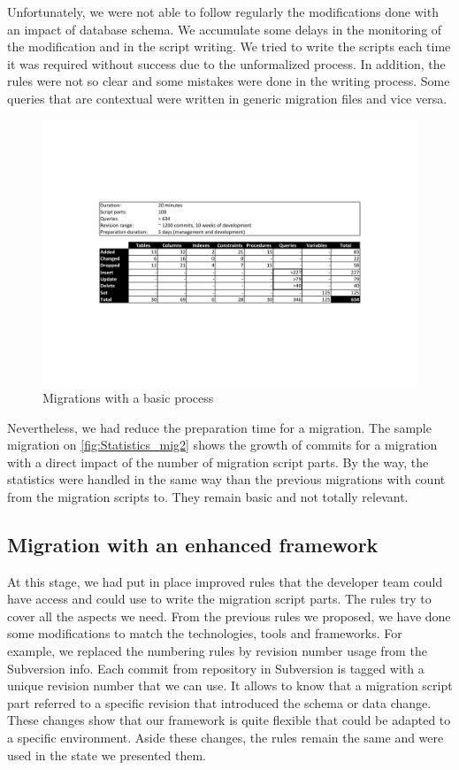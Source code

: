 Unfortunately, we were not able to follow regularly the modifications done with an impact of database schema. We accumulate some delays in the monitoring of the modification and in the script writing. We tried to write the scripts each time it was required without success due to the unformalized process. In addition, the rules were not so clear and some mistakes were done in the writing process. Some queries that are contextual were written in generic migration files and vice versa.

\begin{figure}[h]
        \centering
        \includegraphics[scale=0.65]{images/Statistics_mig2.pdf}
        \caption{Migrations with a basic process}
        \label{fig:Statistics_mig2}
\end{figure}

Nevertheless, we had reduce the preparation time for a migration. The sample migration on \autoref{fig:Statistics_mig2} shows the growth of commits for a migration with a direct impact of the number of migration script parts. By the way, the statistics were handled in the same way than the previous migrations with count from the migration scripts to. They remain basic and not totally relevant.

\subsection{Migration with an enhanced framework}

At this stage, we had put in place improved rules that the developer team could have access and could use to write the migration script parts. The rules try to cover all the aspects we need. From the previous rules we proposed, we have done some modifications to match the technologies, tools and frameworks. For example, we replaced the numbering rules by revision number usage from the Subversion info. Each commit from repository in Subversion is tagged with a unique revision number that we can use. It allows to know that a migration script part referred to a specific revision that introduced the schema or data change. These changes show that our framework is quite flexible that could be adapted to a specific environment. Aside these changes, the rules remain the same and were used in the state we presented them.

